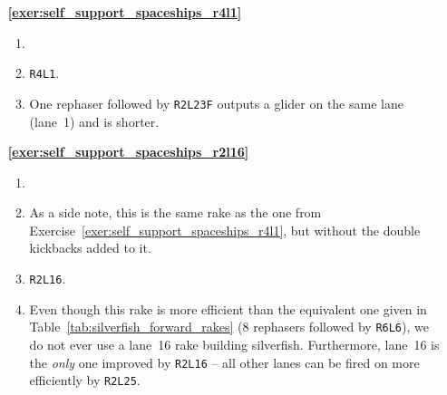 \begin{multicols}{2}
	\begin{itemize}[leftmargin=0em]
		\item[\bf\color{ocre}\sffamily\ref{exer:self_support_spaceships_r4l1}] \begin{enumerate}[leftmargin=1.5em,label=\bf\color{ocre}(\alph*)]
			\item {} \\
			
			\item \texttt{R4L1}.
			
			\item One rephaser followed by \texttt{R2L23F} outputs a glider on the same lane (lane~1) and is shorter.\\
		\end{enumerate}
	
	
		\item[\bf\color{ocre}\sffamily\ref{exer:self_support_spaceships_r2l16}] \begin{enumerate}[leftmargin=1.5em,label=\bf\color{ocre}(\alph*)]
			\item {} \\
			
			\item {} 
			
			As a side note, this is the same rake as the one from Exercise~\ref{exer:self_support_spaceships_r4l1}, but without the double kickbacks added to it.\\
			
			\item \texttt{R2L16}.
			
			\item Even though this rake is more efficient than the equivalent one given in Table~\ref{tab:silverfish_forward_rakes} (8 rephasers followed by \texttt{R6L6}), we do not ever use a lane~16 rake building silverfish. Furthermore, lane~16 is the \emph{only} one improved by \texttt{R2L16} -- all other lanes can be fired on more efficiently by \texttt{R2L25}.\\
		\end{enumerate}
	\end{itemize}
\end{multicols}




